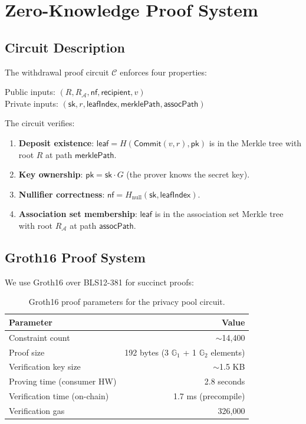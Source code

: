 \section{Zero-Knowledge Proof System}
\label{sec:zk}

\subsection{Circuit Description}

The withdrawal proof circuit $\mathcal{C}$ enforces four properties:

\begin{definition}
Public inputs: $(R, R_{\mathcal{A}}, \mathsf{nf}, \mathsf{recipient}, v)$\\
Private inputs: $(\mathsf{sk}, r, \mathsf{leafIndex}, \mathsf{merklePath}, \mathsf{assocPath})$

The circuit verifies:
\begin{enumerate}
    \item \textbf{Deposit existence}: $\mathsf{leaf} = H(\mathsf{Commit}(v, r), \mathsf{pk})$ is in the Merkle tree with root $R$ at path $\mathsf{merklePath}$.
    \item \textbf{Key ownership}: $\mathsf{pk} = \mathsf{sk} \cdot G$ (the prover knows the secret key).
    \item \textbf{Nullifier correctness}: $\mathsf{nf} = H_{\text{null}}(\mathsf{sk}, \mathsf{leafIndex})$.
    \item \textbf{Association set membership}: $\mathsf{leaf}$ is in the association set Merkle tree with root $R_{\mathcal{A}}$ at path $\mathsf{assocPath}$.
\end{enumerate}
\end{definition}

\subsection{Groth16 Proof System}

We use Groth16 \cite{groth2016size} over BLS12-381 for succinct proofs:

\begin{table}[H]
\centering
\caption{Groth16 proof parameters for the privacy pool circuit.}
\label{tab:groth16}
\begin{tabular}{lr}
\toprule
\textbf{Parameter} & \textbf{Value} \\
\midrule
Constraint count & $\sim$14,400 \\
Proof size & 192 bytes (3 $\mathbb{G}_1$ + 1 $\mathbb{G}_2$ elements) \\
Verification key size & $\sim$1.5 KB \\
Proving time (consumer HW) & 2.8 seconds \\
Verification time (on-chain) & 1.7 ms (precompile) \\
Verification gas & 326,000 \\
\bottomrule
\end{tabular}
\end{table}

